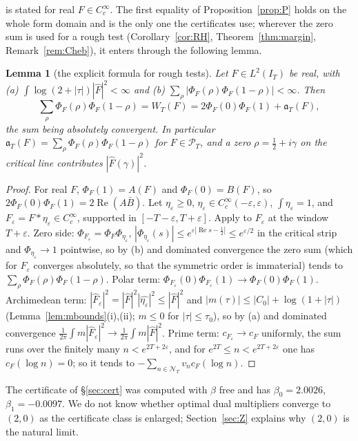 \documentclass[11pt]{amsart}
\newtheorem{lemma}[theorem]{Lemma}
\theoremstyle{definition}
\theoremstyle{remark}
\newcommand{\Rel}{\operatorname{Re}}
\newcommand{\PT}{\mathcal P_T}
\newcommand{\IT}{I_T}
\newcommand{\Fh}{\widehat F}
\newcommand{\cF}{c_F}
\newcommand{\NT}{\mathcal N_T}
\begin{document}
\cite[Thm.~8.4]{Paper45} is stated for real $F\in C_c^\infty$. The first equality of
Proposition~\ref{prop:P} holds on the whole form domain and is the only one the certificates use;
wherever the zero sum is used for a rough test (Corollary~\ref{cor:RH}, Theorem~\ref{thm:margin},
Remark~\ref{rem:Cheb}), it enters through the following lemma.

\begin{lemma}[the explicit formula for rough tests]\label{lem:roughEF}
Let $F\in L^2(\IT)$ be real, with \emph{(a)} $\int\log(2+|\tau|)|\Fh|^2<\infty$ and \emph{(b)}
$\sum_\rho|\Phi_F(\rho)\Phi_F(1-\rho)|<\infty$. Then
\[
\sum_\rho\Phi_F(\rho)\Phi_F(1-\rho)=W_T(F)=2\Phi_F(0)\Phi_F(1)+\mathfrak a_T(F),
\]
the sum being absolutely convergent. In particular $\mathfrak a_T(F)=\sum_\rho\Phi_F(\rho)\Phi_F(1-\rho)$
for $F\in\PT$, and a zero $\rho=\frac12+i\gamma$ on the critical line contributes $|\Fh(\gamma)|^2$.
\end{lemma}
\begin{proof}
For real $F$, $\Phi_F(1)=A(F)$ and $\Phi_F(0)=B(F)$, so $2\Phi_F(0)\Phi_F(1)=2\Rel(A\bar B)$. Let
$\eta_\varepsilon\ge0$, $\eta_\varepsilon\in C_c^\infty(-\varepsilon,\varepsilon)$, $\int\eta_\varepsilon=1$,
and $F_\varepsilon=F*\eta_\varepsilon\in C_c^\infty$, supported in $[-T-\varepsilon,T+\varepsilon]$.
Apply \cite[Thm.~8.4]{Paper45} to $F_\varepsilon$ at the window $T+\varepsilon$. Zero side:
$\Phi_{F_\varepsilon}=\Phi_F\Phi_{\eta_\varepsilon}$, $|\Phi_{\eta_\varepsilon}(s)|\le e^{\varepsilon|\Rel s-\frac12|}\le e^{\varepsilon/2}$
in the critical strip and $\Phi_{\eta_\varepsilon}\to1$ pointwise, so by (b) and dominated convergence
the zero sum (which for $F_\varepsilon$ converges absolutely, so that the symmetric order is
immaterial) tends to $\sum_\rho\Phi_F(\rho)\Phi_F(1-\rho)$. Polar term:
$\Phi_{F_\varepsilon}(0)\Phi_{F_\varepsilon}(1)\to\Phi_F(0)\Phi_F(1)$. Archimedean term:
$|\Fh_\varepsilon|^2=|\Fh|^2|\widehat{\eta_\varepsilon}|^2\le|\Fh|^2$ and $|m(\tau)|\le|C_0|+\log(1+|\tau|)$
(Lemma~\ref{lem:mbounds}(i),(ii); $m\le0$ for $|\tau|\le\tau_0$), so by (a) and dominated convergence
$\frac1{2\pi}\int m|\Fh_\varepsilon|^2\to\frac1{2\pi}\int m|\Fh|^2$. Prime term: $c_{F_\varepsilon}\to\cF$
uniformly, the sum runs over the finitely many $n<e^{2T+2\varepsilon}$, and for
$e^{2T}\le n<e^{2T+2\varepsilon}$ one has $\cF(\log n)=0$; so it tends to $-\sum_{n\in\NT}v_n\cF(\log n)$.
\end{proof}

The certificate of \S\ref{sec:cert} was computed with $\beta$ free and has $\beta_0=2.0026$,
$\beta_1=-0.0097$. We do not know whether optimal dual multipliers converge to $(2,0)$ as the
certificate class is enlarged; Section~\ref{sec:Z} explains why $(2,0)$ is the natural limit.
\end{document}
